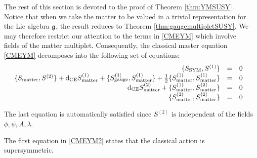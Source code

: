 \documentclass[10pt, oneside]{article}
\newcommand{\gauge}{\mathrm{gauge}}
\newcommand{\matter}{\mathrm{matter}}
\begin{document}
The rest of this section is devoted to the proof of Theorem \ref{thm:YMSUSY}. 
Notice that when we take the matter to be valued in a trivial representation for the Lie algebra $\mathfrak g$, the result reduces to Theorem \ref{thm:gaugemultipletSUSY}.
We may therefore restrict our attention to the terms in \eqref{CMEYM} which involve fields of the matter multiplet. 
Consequently, the classical master equation \eqref{CMEYM} decomposes into the following set of equations:
\begin{equation}
\label{CMEYM2}
\begin{array}{rrrrrr}
\{S_{\rm SYM} , S^{(1)}\} & = & 0 \\ 
\{S_{\matter}, S^{(2)}\} + \d_{\mr{CE}} S_{\matter}^{(1)} + \{S_{\gauge}^{(1)}, S_{\matter}^{(1)}\} + \frac{1}{2} \{S_{\matter}^{(1)}, S_{\matter}^{(1)}\} & = & 0 \\
\d_{\mr{CE}} S_{\matter}^{(2)} + \{S_{\matter}^{(1)}, S_{\matter}^{(2)}\} & =& 0 \\
\{S_{\matter}^{(2)}, S_{\matter}^{(2)}\} & =& 0
\end{array}
\end{equation}

The last equation is automatically satisfied since $S^{(2)}$ is independent of the fields $\phi, \psi, A, \lambda$.

The first equation in \eqref{CMEYM2} states that the classical action is supersymmetric.
\end{document}
